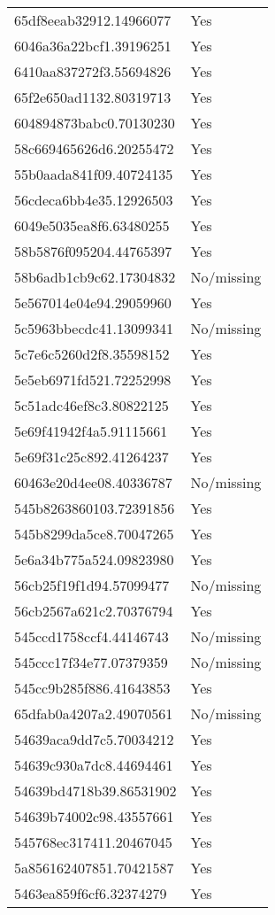 \begin{tabular}{ll}
65df8eeab32912.14966077 & Yes \\
6046a36a22bcf1.39196251 & Yes \\
6410aa837272f3.55694826 & Yes \\
65f2e650ad1132.80319713 & Yes \\
604894873babc0.70130230 & Yes \\
58c669465626d6.20255472 & Yes \\
55b0aada841f09.40724135 & Yes \\
56cdeca6bb4e35.12926503 & Yes \\
6049e5035ea8f6.63480255 & Yes \\
58b5876f095204.44765397 & Yes \\
58b6adb1cb9c62.17304832 & No/missing \\
5e567014e04e94.29059960 & Yes \\
5c5963bbecdc41.13099341 & No/missing \\
5c7e6c5260d2f8.35598152 & Yes \\
5e5eb6971fd521.72252998 & Yes \\
5c51adc46ef8c3.80822125 & Yes \\
5e69f41942f4a5.91115661 & Yes \\
5e69f31c25c892.41264237 & Yes \\
60463e20d4ee08.40336787 & No/missing \\
545b8263860103.72391856 & Yes \\
545b8299da5ce8.70047265 & Yes \\
5e6a34b775a524.09823980 & Yes \\
56cb25f19f1d94.57099477 & No/missing \\
56cb2567a621c2.70376794 & Yes \\
545ccd1758ccf4.44146743 & No/missing \\
545ccc17f34e77.07379359 & No/missing \\
545cc9b285f886.41643853 & Yes \\
65dfab0a4207a2.49070561 & No/missing \\
54639aca9dd7c5.70034212 & Yes \\
54639c930a7dc8.44694461 & Yes \\
54639bd4718b39.86531902 & Yes \\
54639b74002c98.43557661 & Yes \\
545768ec317411.20467045 & Yes \\
5a856162407851.70421587 & Yes \\
5463ea859f6cf6.32374279 & Yes \\

\end{tabular}
